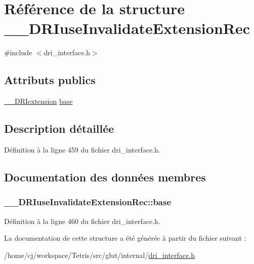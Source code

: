 \hypertarget{struct_____d_r_iuse_invalidate_extension_rec}{\section{Référence de la structure \-\_\-\-\_\-\-D\-R\-Iuse\-Invalidate\-Extension\-Rec}
\label{struct_____d_r_iuse_invalidate_extension_rec}
}


{\ttfamily \#include $<$dri\-\_\-interface.\-h$>$}

\subsection*{Attributs publics}
\begin{DoxyCompactItemize}
\item 
\hyperlink{dri__interface_8h_a4e0a61c8ece00d2b2c6792a9a1b55385}{\-\_\-\-\_\-\-D\-R\-Iextension} \hyperlink{struct_____d_r_iuse_invalidate_extension_rec_a1d27faf34ceb9d07a7dac9eeff50f209}{base}
\end{DoxyCompactItemize}


\subsection{Description détaillée}


Définition à la ligne 459 du fichier dri\-\_\-interface.\-h.



\subsection{Documentation des données membres}
\hypertarget{struct_____d_r_iuse_invalidate_extension_rec_a1d27faf34ceb9d07a7dac9eeff50f209}{
\subsubsection[{base}]{ \-\_\-\-\_\-\-D\-R\-Iuse\-Invalidate\-Extension\-Rec\-::base}}\label{struct_____d_r_iuse_invalidate_extension_rec_a1d27faf34ceb9d07a7dac9eeff50f209}


Définition à la ligne 460 du fichier dri\-\_\-interface.\-h.



La documentation de cette structure a été générée à partir du fichier suivant \-:\begin{DoxyCompactItemize}
\item 
/home/cj/workspace/\-Tetris/src/glut/internal/\hyperlink{dri__interface_8h}{dri\-\_\-interface.\-h}\end{DoxyCompactItemize}
